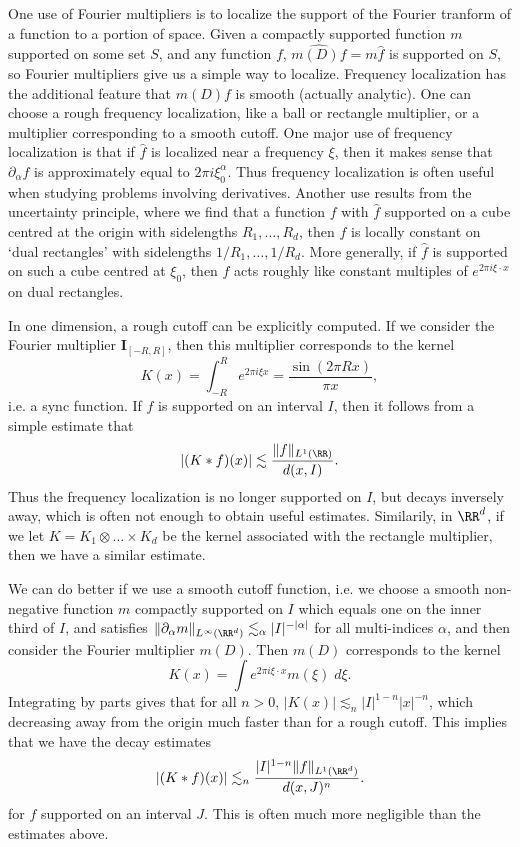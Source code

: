 One use of Fourier multipliers is to localize the support of the Fourier tranform of a function to a portion of space. Given a compactly supported function $m$ supported on some set $S$, and any function $f$, $\widehat{m(D) f} = m \widehat{f}$ is supported on $S$, so Fourier multipliers give us a simple way to localize. Frequency localization has the additional feature that $m(D) f$ is smooth (actually analytic).  One can choose a rough frequency localization, like a ball or rectangle multiplier, or a multiplier corresponding to a smooth cutoff. One major use of frequency localization is that if $\widehat{f}$ is localized near a frequency $\xi$, then it makes sense that $\partial_\alpha f$ is approximately equal to $2 \pi i \xi_0^\alpha$. Thus frequency localization is often useful when studying problems involving derivatives. Another use results from the uncertainty principle, where we find that a function $f$ with $\widehat{f}$ supported on a cube centred at the origin with sidelengths $R_1, \dots, R_d$, then $f$ is locally constant on `dual rectangles' with sidelengths $1/R_1, \dots, 1/R_d$. More generally, if $\widehat{f}$ is supported on such a cube centred at $\xi_0$, then $f$ acts roughly like constant multiples of $e^{2 \pi i \xi \cdot x}$ on dual rectangles.

In one dimension, a rough cutoff can be explicitly computed. If we consider the Fourier multiplier $\mathbf{I}_{[-R,R]}$, then this multiplier corresponds to the kernel
%
\[ K(x) = \int_{-R}^R e^{2 \pi i \xi x} = \frac{\sin(2 \pi R x)}{\pi x}, \]
%
i.e. a sync function. If $f$ is supported on an interval $I$, then it follows from a simple estimate that
%
\[ |(K * f)(x)| \lesssim \frac{\| f \|_{L^1(\RR)}}{d(x,I)}. \]
%
Thus the frequency localization is no longer supported on $I$, but decays inversely away, which is often not enough to obtain useful estimates. Similarily, in $\RR^d$, if we let $K = K_1 \otimes \dots \times K_d$ be the kernel associated with the rectangle multiplier, then we have a similar estimate.

We can do better if we use a smooth cutoff function, i.e. we choose a smooth non-negative function $m$ compactly supported on $I$ which equals one on the inner third of $I$, and satisfies $\| \partial_\alpha m \|_{L^\infty(\RR^d)} \lesssim_\alpha |I|^{-|\alpha|}$ for all multi-indices $\alpha$, and then consider the Fourier multiplier $m(D)$. Then $m(D)$ corresponds to the kernel
%
\[ K(x) = \int e^{2 \pi i \xi \cdot x} m(\xi)\; d\xi. \]
%
Integrating by parts gives that for all $n > 0$, $|K(x)| \lesssim_n |I|^{1-n} |x|^{-n}$, which decreasing away from the origin much faster than for a rough cutoff. This implies that we have the decay estimates
%
\[ |(K * f)(x)| \lesssim_n \frac{|I|^{1-n} \| f \|_{L^1(\RR^d)}}{d(x,J)^n}. \]
%
for $f$ supported on an interval $J$. This is often much more negligible than the estimates above.









